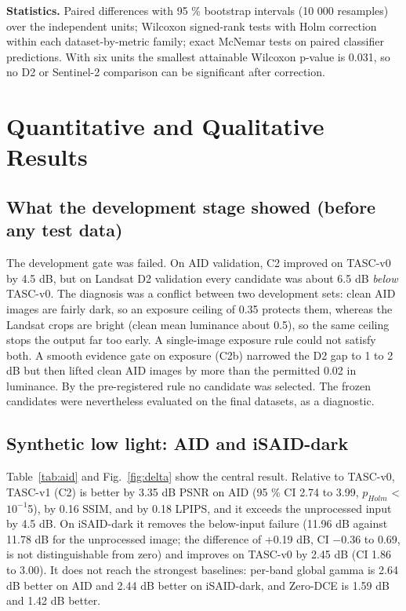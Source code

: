 \documentclass[conference]{IEEEtran}
\begin{document}
\textbf{Statistics.} Paired differences with 95 \% bootstrap intervals (10 000 resamples) over the independent units; Wilcoxon signed-rank tests with Holm correction \cite{holm1979} within each dataset-by-metric family; exact McNemar tests on paired classifier predictions. With six units the smallest attainable Wilcoxon p-value is 0.031, so no D2 or Sentinel-2 comparison can be significant after correction.

\section{Quantitative and Qualitative Results}
\subsection{What the development stage showed (before any test data)}
The development gate was failed. On AID validation, C2 improved on TASC-v0 by 4.5 dB, but on Landsat D2 validation every candidate was about 6.5 dB \emph{below} TASC-v0. The diagnosis was a conflict between two development sets: clean AID images are fairly dark, so an exposure ceiling of 0.35 protects them, whereas the Landsat crops are bright (clean mean luminance about 0.5), so the same ceiling stops the output far too early. A single-image exposure rule could not satisfy both. A smooth evidence gate on exposure (C2b) narrowed the D2 gap to 1 to 2 dB but then lifted clean AID images by more than the permitted 0.02 in luminance. By the pre-registered rule no candidate was selected. The frozen candidates were nevertheless evaluated on the final datasets, as a diagnostic.

\subsection{Synthetic low light: AID and iSAID-dark}
Table~\ref{tab:aid} and Fig.~\ref{fig:delta} show the central result. Relative to TASC-v0, TASC-v1 (C2) is better by 3.35 dB PSNR on AID (95 \% CI 2.74 to 3.99, $p_{Holm}$ < $10^{-1}$5), by 0.16 SSIM, and by 0.18 LPIPS, and it exceeds the unprocessed input by 4.5 dB. On iSAID-dark it removes the below-input failure (11.96 dB against 11.78 dB for the unprocessed image; the difference of +0.19 dB, CI $-$0.36 to 0.69, is not distinguishable from zero) and improves on TASC-v0 by 2.45 dB (CI 1.86 to 3.00). It does not reach the strongest baselines: per-band global gamma is 2.64 dB better on AID and 2.44 dB better on iSAID-dark, and Zero-DCE is 1.59 dB and 1.42 dB better.
\end{document}
